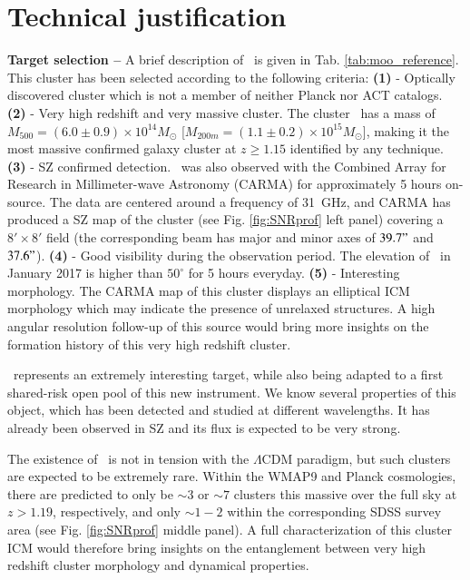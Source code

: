 \documentclass[11pt,a4paper,twoside,graphicx,color]{article}
\begin{document}
\section{Technical justification}
{\bf \large Target selection -- }
A brief description of \moo\ is given in Tab. \ref{tab:moo_reference}. This cluster has been selected according to the following criteria: \textbf{(1)} - Optically discovered cluster which is not a member of neither Planck nor ACT catalogs. \textbf{(2)} - Very high redshift and very massive cluster. The cluster \moo\ has a mass of $M_{500} = (6.0 \pm 0.9) \times 10^{14} M_{\odot}$ [$M_{200m} = (1.1 \pm 0.2) \times 10^{15} M_{\odot}$], making it the most massive confirmed galaxy cluster at $z \geq 1.15$ identified by any technique. \textbf{(3)} - SZ confirmed detection. \moo\ was also observed with the Combined Array for Research in Millimeter-wave Astronomy (CARMA) for approximately 5 hours on-source. The data are centered around a frequency of 31~GHz, and CARMA has produced a SZ map of the cluster (see Fig. \ref{fig:SNRprof} left panel) covering a $8' \times 8'$ field (the corresponding beam has major and minor axes of $39.7"$ and $37.6"$). \textbf{(4)} - Good visibility during the observation period. The elevation of \moo\ in January 2017 is higher than $50^\circ$ for 5 hours everyday.  \textbf{(5)} - Interesting morphology. The CARMA map of this cluster displays an elliptical ICM morphology which may indicate the presence of unrelaxed structures. A high angular resolution follow-up of this source would bring more insights on the formation history of this very high redshift cluster.

\moo\ represents an extremely interesting target, while also being adapted to a first shared-risk open pool of this new instrument. We know several properties of this object, which has been detected and studied at different wavelengths. It has already been observed in SZ and its flux is expected to be very strong.

The existence of \moo\ is not in tension with the $\Lambda$CDM paradigm, but such clusters are expected to be extremely rare. Within the WMAP9 and Planck cosmologies, there are predicted to only be $\sim 3$ or $\sim 7$ clusters this massive over the full sky at $z >1.19$, respectively, and only $\sim 1-2$ within the corresponding SDSS survey area (see Fig. \ref{fig:SNRprof} middle panel). A full characterization of this cluster ICM would therefore bring insights on the entanglement between very high redshift cluster morphology and dynamical properties.
\end{document}
